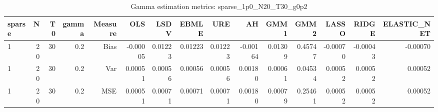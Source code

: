 \begin{table}[!htbp]\centering
\caption{Gamma estimation metrics: sparse_1p0_N20_T30_g0p2}
\label{tab:table1_sparse_1p0_N20_T30_g0p2}
\begin{tabular}{lrrrrrrrrrrrrrr}
\hline
sparse & N & T0 & gamma & Measure & OLS & LSDV & EBMLE & URE & AH & GMM1 & GMM2 & LASSO & RIDGE & ELASTIC_NET \\
\hline
1 & 20 & 30 & 0.2 & Bias & -0.00005 & 0.01223 & 0.01223 & 0.01223 & -0.00164 & 0.01309 & 0.45747 & -0.00070 & -0.00043 & -0.00070 \\
1 & 20 & 30 & 0.2 & Var & 0.00051 & 0.00056 & 0.00056 & 0.00056 & 0.00180 & 0.00061 & 0.04534 & 0.00052 & 0.00052 & 0.00052 \\
1 & 20 & 30 & 0.2 & MSE & 0.00051 & 0.00071 & 0.00071 & 0.00071 & 0.00180 & 0.00079 & 0.25461 & 0.00052 & 0.00052 & 0.00052 \\
\hline
\end{tabular}
\end{table}

